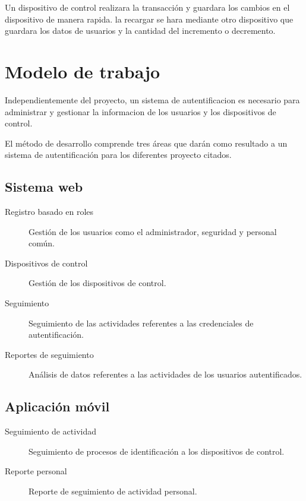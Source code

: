 \documentclass[11pt,twocolumn]{article}
\begin{document}
Un dispositivo de control realizara la transacci\'on y guardara los cambios en el dispositivo de manera rapida. la recargar se hara mediante  otro dispositivo que guardara los datos de usuarios y la cantidad del incremento o decremento.



\section{Modelo de trabajo}  

Independientemente del proyecto, un sistema de autentificacion es necesario para administrar y gestionar la informacion de los usuarios y los dispositivos de control.

El m\'etodo de desarrollo comprende tres \'areas  que dar\'an como resultado a un sistema de autentificaci\'on  para los diferentes  proyecto citados.\\

	\subsection{ Sistema web }
	
	\begin{description}
		\item [Registro basado en roles] Gesti\'on de los usuarios como el administrador, seguridad y personal com\'un.
		\item [Dispositivos de control] Gesti\'on de los dispositivos de control.
		\item [Seguimiento] Seguimiento de las actividades referentes a las credenciales de autentificaci\'on.
		\item [Reportes de seguimiento] An\'alisis de datos referentes a las actividades de los usuarios autentificados.
	\end{description}
	
	\subsection{Aplicaci\'on m\'ovil}		
	
	 \begin{description}
		 \item[Seguimiento de actividad] Seguimiento de procesos de identificaci\'on a los dispositivos de control.
		 \item[Reporte personal] Reporte de seguimiento de actividad personal.
	 \end{description}
	
\end{document}

